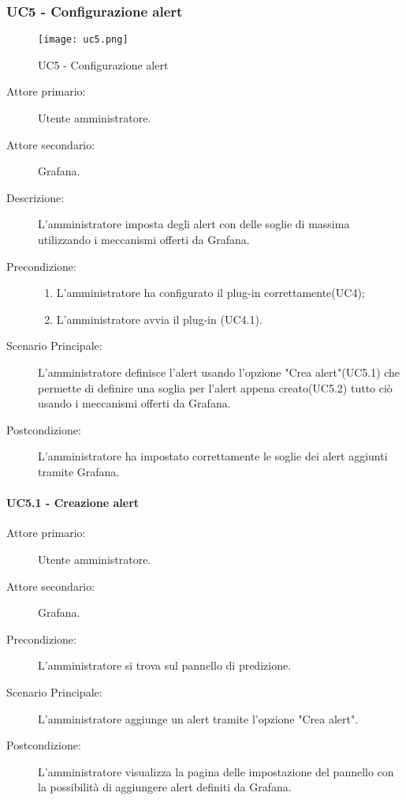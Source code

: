 \subsubsection{UC5 - Configurazione alert}
\label{sssec:uc5}

\begin{figure}[h!]
  \begin{center}
    \texttt{[image: uc5.png]}\\
    \caption{UC5 - Configurazione alert}%
    \label{fig:uc5}
  \end{center}
  \end{figure}

\begin{description}
	\item[Attore primario:] Utente amministratore.
	\item[Attore secondario:] Grafana.
	\item[Descrizione:] L'amministratore imposta degli alert con delle soglie di massima utilizzando i meccanismi offerti da Grafana.
	\item[Precondizione:]
	\begin{enumerate}
		\item L'amministratore ha configurato il plug-in correttamente(UC4);
		\item L'amministratore avvia il plug-in (UC4.1).
	\end {enumerate}
	\item[Scenario Principale:] L'amministratore definisce l'alert usando l'opzione "Crea alert"(UC5.1) che permette di definire una soglia per l'alert appena creato(UC5.2) tutto ciò usando i meccanismi offerti da Grafana.
	\item[Postcondizione:] L'amministratore ha impostato correttamente le soglie dei alert aggiunti tramite Grafana.
\end{description}

\paragraph{UC5.1 - Creazione alert}
\label{sssec:uc5.1}
\begin{description}
	\item[Attore primario:] Utente amministratore.
	\item[Attore secondario:] Grafana.
	\item[Precondizione:] L'amministratore si trova sul pannello di predizione.
	\item[Scenario Principale:] L'amministratore aggiunge un alert tramite l'opzione "Crea alert".
	\item[Postcondizione:] L'amministratore visualizza la pagina delle impostazione del pannello con la possibilità di aggiungere alert definiti da Grafana.
\end{description}

